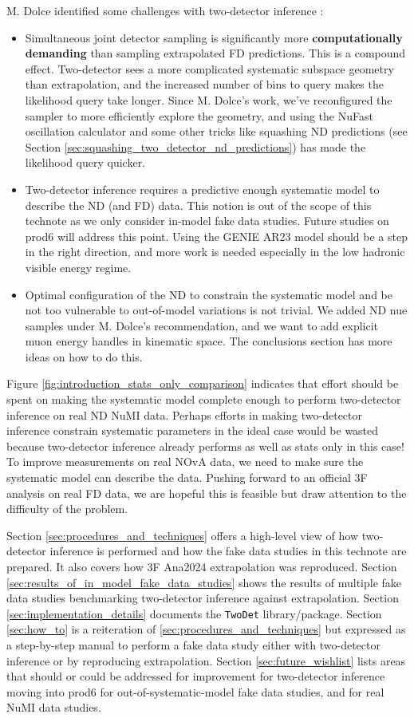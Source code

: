 \documentclass{article}
\begin{document}
M. Dolce identified some challenges with two-detector inference \cite{ref:mike_thesis}:
\begin{itemize}
  \item Simultaneous joint detector sampling is significantly more \textbf{computationally demanding} than sampling extrapolated FD predictions. This is a compound effect. Two-detector sees a more complicated systematic subspace geometry than extrapolation, and the increased number of bins to query makes the likelihood query take longer. Since M. Dolce's work, we've reconfigured the sampler to more efficiently explore the geometry, and using the NuFast oscillation calculator \cite{ref:nufast_technote} and some other tricks like squashing ND predictions (see Section \ref{sec:squashing_two_detector_nd_predictions}) has made the likelihood query quicker.
  \item Two-detector inference requires a predictive enough systematic model to describe the ND (and FD) data. This notion is out of the scope of this technote as we only consider in-model fake data studies. Future studies on prod6 will address this point. Using the GENIE AR23 model should be a step in the right direction, and more work is needed especially in the low hadronic visible energy regime.
  \item Optimal configuration of the ND to constrain the systematic model and be not too vulnerable to out-of-model variations is not trivial. We added ND nue samples under M. Dolce's recommendation, and we want to add explicit muon energy handles in kinematic space. The conclusions section has more ideas on how to do this.
\end{itemize}

Figure \ref{fig:introduction_stats_only_comparison} indicates that effort should be spent on making the systematic model complete enough to perform two-detector inference on real ND NuMI data. Perhaps efforts in making two-detector inference constrain systematic parameters in the ideal case would be wasted because two-detector inference already performs as well as stats only in this case! To improve measurements on real NOvA data, we need to make sure the systematic model can describe the data. Pushing forward to an official 3F analysis on real FD data, we are hopeful this is feasible but draw attention to the difficulty of the problem.

Section \ref{sec:procedures_and_techniques} offers a high-level view of how two-detector inference is performed and how the fake data studies in this technote are prepared. It also covers how 3F Ana2024 extrapolation was reproduced. Section \ref{sec:results_of_in_model_fake_data_studies} shows the results of multiple fake data studies benchmarking two-detector inference against extrapolation. Section \ref{sec:implementation_details} documents the \texttt{Two\-Det} library/package. Section \ref{sec:how_to} is a reiteration of \ref{sec:procedures_and_techniques} but expressed as a step-by-step manual to perform a fake data study either with two-detector inference or by reproducing extrapolation. Section \ref{sec:future_wishlist} lists areas that should or could be addressed for improvement for two-detector inference moving into prod6 for out-of-systematic-model fake data studies, and for real NuMI data studies.
\end{document}
